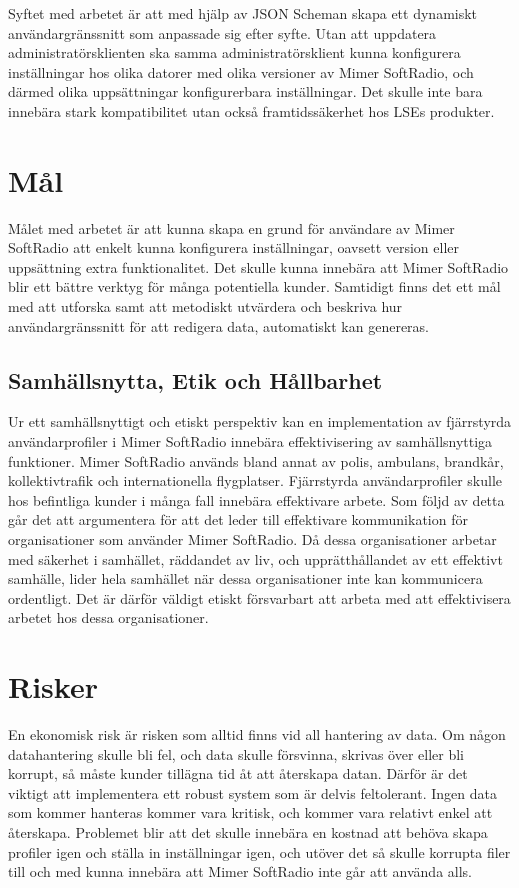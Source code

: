 Syftet med arbetet är att med hjälp av JSON Scheman skapa ett dynamiskt användargränssnitt som anpassade sig efter syfte. Utan att uppdatera administratörsklienten ska samma administratörsklient kunna konfigurera inställningar hos olika datorer med olika versioner av Mimer SoftRadio, och därmed olika uppsättningar konfigurerbara inställningar. Det skulle inte bara innebära stark kompatibilitet utan också framtidssäkerhet hos LSEs produkter.

\section{Mål}
\label{sec:intro:mål}
Målet med arbetet är att kunna skapa en grund för användare av Mimer SoftRadio att enkelt kunna konfigurera inställningar, oavsett version eller uppsättning extra funktionalitet. Det skulle kunna innebära att Mimer SoftRadio blir ett bättre verktyg för många potentiella kunder. Samtidigt finns det ett mål med att utforska samt att metodiskt utvärdera och beskriva hur användargränssnitt för att redigera data, automatiskt kan genereras.

\subsection{Samhällsnytta, Etik och Hållbarhet}

Ur ett samhällsnyttigt och etiskt perspektiv kan en implementation av fjärrstyrda användarprofiler i Mimer SoftRadio innebära effektivisering av samhällsnyttiga funktioner. Mimer SoftRadio används bland annat av polis, ambulans, brandkår, kollektivtrafik och internationella flygplatser. Fjärrstyrda användarprofiler skulle hos befintliga kunder i många fall innebära effektivare arbete. Som följd av detta går det att argumentera för att det leder till effektivare kommunikation för organisationer som använder Mimer SoftRadio. Då dessa organisationer arbetar med säkerhet i samhället, räddandet av liv, och upprätthållandet av ett effektivt samhälle, lider hela samhället när dessa organisationer inte kan kommunicera ordentligt. Det är därför väldigt etiskt försvarbart att arbeta med att effektivisera arbetet hos dessa organisationer.

\section{Risker}
\label{sec:intro:risker}
En ekonomisk risk är risken som alltid finns vid all hantering av data. Om någon datahantering skulle bli fel, och data skulle försvinna, skrivas över eller bli korrupt, så måste kunder tillägna tid åt att återskapa datan. Därför är det viktigt att implementera ett robust system som är delvis feltolerant. Ingen data som kommer hanteras kommer vara kritisk, och kommer vara relativt enkel att återskapa. Problemet blir att det skulle innebära en kostnad att behöva skapa profiler igen och ställa in inställningar igen, och utöver det så skulle korrupta filer till och med kunna innebära att Mimer SoftRadio inte går att använda alls.


